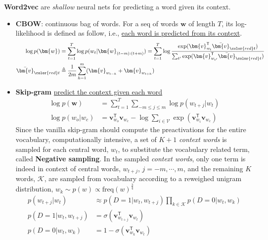 

\textbf{Word2vec} are \textit{shallow} neural nets for predicting a word given its context.
\begin{itemize}
    \item \textbf{CBOW}: continuous bag of words. For a seq of words $\bm{w}$ of length $T$, its log-likelihood is defined as follow, i.e., \uline{each word is predicted from its context}.
    \begin{align}
        \log p(\bm{w}) & = \sum_{t=1}^T\log p(w_t|\bm{w}_{(t-m):(t+m)})=\sum_{t=1}^T\log\frac{\exp(\bm{v}_{w_t}^\mathsf{T}\bar{\bm{v}}_{\color{red}t})}{\sum_{t'}\exp(\bm{v}_{w_{t'}}^\mathsf{T}\Bar{\bm{v}}_{\color{red}t})} \\
        \bar{\bm{v}}_{\color{red}t} & \triangleq \frac{1}{2m}\sum_{h=1}^m(\bm{v}_{w_{t-h}}+\bm{v}_{w_{t+h}})
    \end{align}

    \item \textbf{Skip-gram} \uline{predict the context given each word}
    \begin{align}
        \log p(\bm{w}) & = \sum_{t=1}^T\sum_{-m\leq j\leq m}\log p(w_{t+j}|w_t) \\
        \log p(w_o|w_c) & = \bm{v}_{w_o}^\mathsf{T}\bm{v}_{w_c} - \log\sum_{i\in\mathcal{V}}\exp(\bm{v}_{w_i}^\mathsf{T}\bm{v}_{w_c})
    \end{align}
    Since the vanilla skip-gram should compute the preactivations for the entire vocabulary, computationally intensive,
    a set of $K+1$ \textit{context words} is sampled for each central word, $w_t$, to substitute the vocabulary related term, 
    called \textbf{Negative sampling}.
    In the sampled \textit{context words}, only one term is indeed in context of central words, $w_{t+j}$, $j=-m,\cdots,m$,
    and the remaining $K$ words, $\mathcal{K}$, are sampled from vocabulary according to a reweighed unigram distribution, 
    $w_k\sim p(w)\propto\mathrm{freq}(w)^\frac{3}{4}$
    \begin{align}
        p(w_{t+j}|w_t) & \approx p(D=1|w_t,w_{t+j})\prod_{k\in\mathcal{K}} p(D=0|w_t,w_k) \\
        p(D=1|w_t,w_{t+j}) & = \sigma(\bm{v}_{w_{t+j}}^\mathsf{T}\bm{v}_{w_t}) \\
        p(D=0|w_t,w_k) & = 1 - \sigma(\bm{v}_{w_k}^\mathsf{T}\bm{v}_{w_t})
    \end{align}
\end{itemize}

